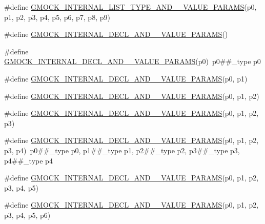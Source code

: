 \begin{DoxyCompactItemize}
\item 
\#define \mbox{\hyperlink{gmock-generated-actions_8h_a646b96a3f316fa629cf7faaf509de76e}{G\+M\+O\+C\+K\+\_\+\+I\+N\+T\+E\+R\+N\+A\+L\+\_\+\+L\+I\+S\+T\+\_\+\+T\+Y\+P\+E\+\_\+\+A\+N\+D\+\_\+\_\+\+V\+A\+L\+U\+E\+\_\+\+P\+A\+R\+A\+MS}}(p0,  p1,  p2,  p3,  p4,  p5,  p6,  p7,  p8,  p9)
\item 
\#define \mbox{\hyperlink{gmock-generated-actions_8h_afbcc498768661d32cb658a8eb28535a9}{G\+M\+O\+C\+K\+\_\+\+I\+N\+T\+E\+R\+N\+A\+L\+\_\+\+D\+E\+C\+L\+\_\+\+A\+N\+D\+\_\+\_\+\+V\+A\+L\+U\+E\+\_\+\+P\+A\+R\+A\+MS}}()
\item 
\#define \mbox{\hyperlink{gmock-generated-actions_8h_a4440fd8222dde30e41f05209f06a2d00}{G\+M\+O\+C\+K\+\_\+\+I\+N\+T\+E\+R\+N\+A\+L\+\_\+\+D\+E\+C\+L\+\_\+\+A\+N\+D\+\_\+\_\+\+V\+A\+L\+U\+E\+\_\+\+P\+A\+R\+A\+MS}}(p0)~p0\#\#\+\_\+type p0
\item 
\#define \mbox{\hyperlink{gmock-generated-actions_8h_ab11df3777b85b01132aa4057017b22ca}{G\+M\+O\+C\+K\+\_\+\+I\+N\+T\+E\+R\+N\+A\+L\+\_\+\+D\+E\+C\+L\+\_\+\+A\+N\+D\+\_\+\_\+\+V\+A\+L\+U\+E\+\_\+\+P\+A\+R\+A\+MS}}(p0,  p1)
\item 
\#define \mbox{\hyperlink{gmock-generated-actions_8h_a81147c9dca4694a07acccd9324990585}{G\+M\+O\+C\+K\+\_\+\+I\+N\+T\+E\+R\+N\+A\+L\+\_\+\+D\+E\+C\+L\+\_\+\+A\+N\+D\+\_\+\_\+\+V\+A\+L\+U\+E\+\_\+\+P\+A\+R\+A\+MS}}(p0,  p1,  p2)
\item 
\#define \mbox{\hyperlink{gmock-generated-actions_8h_a0580c33b8405f1820a382f9b9471f157}{G\+M\+O\+C\+K\+\_\+\+I\+N\+T\+E\+R\+N\+A\+L\+\_\+\+D\+E\+C\+L\+\_\+\+A\+N\+D\+\_\+\_\+\+V\+A\+L\+U\+E\+\_\+\+P\+A\+R\+A\+MS}}(p0,  p1,  p2,  p3)
\item 
\#define \mbox{\hyperlink{gmock-generated-actions_8h_a0fd289b917553899d908b0f406f8f75d}{G\+M\+O\+C\+K\+\_\+\+I\+N\+T\+E\+R\+N\+A\+L\+\_\+\+D\+E\+C\+L\+\_\+\+A\+N\+D\+\_\+\_\+\+V\+A\+L\+U\+E\+\_\+\+P\+A\+R\+A\+MS}}(p0,  p1,  p2,  p3,  p4)~p0\#\#\+\_\+type p0, p1\#\#\+\_\+type p1, p2\#\#\+\_\+type p2, p3\#\#\+\_\+type p3, p4\#\#\+\_\+type p4
\item 
\#define \mbox{\hyperlink{gmock-generated-actions_8h_a80b3221bf467d72d15120045c9f52a6e}{G\+M\+O\+C\+K\+\_\+\+I\+N\+T\+E\+R\+N\+A\+L\+\_\+\+D\+E\+C\+L\+\_\+\+A\+N\+D\+\_\+\_\+\+V\+A\+L\+U\+E\+\_\+\+P\+A\+R\+A\+MS}}(p0,  p1,  p2,  p3,  p4,  p5)
\item 
\#define \mbox{\hyperlink{gmock-generated-actions_8h_af762ce6b60357100fd2c8176ef2f4102}{G\+M\+O\+C\+K\+\_\+\+I\+N\+T\+E\+R\+N\+A\+L\+\_\+\+D\+E\+C\+L\+\_\+\+A\+N\+D\+\_\+\_\+\+V\+A\+L\+U\+E\+\_\+\+P\+A\+R\+A\+MS}}(p0,  p1,  p2,  p3,  p4,  p5,  p6)

\end{DoxyCompactItemize}
